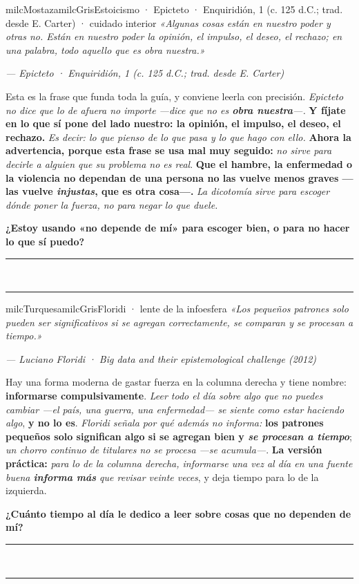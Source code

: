 \documentclass[11pt,letterpaper]{article}
\newcommand{\linead}[1]{\noindent\color{milcLinea}\rule{#1}{0.5pt}\color{milcNegro}}
\begin{document}
\begin{softbox}{milcMostaza}{milcGris}{Estoicismo · Epicteto · Enquiridión, 1 (c. 125 d.C.; trad. desde E. Carter) · cuidado interior}
\textit{«Algunas cosas están en nuestro poder y otras no. Están en nuestro poder la opinión, el impulso, el deseo, el rechazo; en una palabra, todo aquello que es obra nuestra.»}

{\footnotesize\itshape\color{milcNegro!70}--- Epicteto · Enquiridión, 1 (c. 125 d.C.; trad. desde E. Carter)}

Esta es la frase que funda toda la guía, y conviene leerla con precisión. \emph{Epicteto no dice que lo de afuera no importe ---dice que no es \textbf{obra nuestra}---.} \textbf{Y fíjate en lo que sí pone del lado nuestro: la opinión, el impulso, el deseo, el rechazo.} \emph{Es decir: lo que pienso de lo que pasa y lo que hago con ello.} \textbf{Ahora la advertencia, porque esta frase se usa mal muy seguido:} \emph{no sirve para decirle a alguien que su problema no es real}. \textbf{Que el hambre, la enfermedad o la violencia no dependan de una persona no las vuelve menos graves ---las vuelve \emph{injustas}, que es otra cosa---.} \emph{La dicotomía sirve para escoger dónde poner la fuerza, no para negar lo que duele.}

\textbf{¿Estoy usando «no depende de mí» para escoger bien, o para no hacer lo que sí puedo?}
\end{softbox}
\linead{\linewidth}\\[1mm]
\linead{\linewidth}

\begin{softbox}{milcTurquesa}{milcGris}{Floridi · lente de la infoesfera}
\textit{«Los pequeños patrones solo pueden ser significativos si se agregan correctamente, se comparan y se procesan a tiempo.»}

{\footnotesize\itshape\color{milcNegro!70}--- Luciano Floridi · Big data and their epistemological challenge (2012)}

Hay una forma moderna de gastar fuerza en la columna derecha y tiene nombre: \textbf{informarse compulsivamente}. \emph{Leer todo el día sobre algo que no puedes cambiar ---el país, una guerra, una enfermedad--- se siente como estar haciendo algo}, \textbf{y no lo es}. \emph{Floridi señala por qué además no informa:} \textbf{los patrones pequeños solo significan algo si se agregan bien y \emph{se procesan a tiempo}}; \emph{un chorro continuo de titulares no se procesa ---se acumula---}. \textbf{La versión práctica:} \emph{para lo de la columna derecha, informarse una vez al día en una fuente buena \textbf{informa más} que revisar veinte veces}, y deja tiempo para lo de la izquierda.

\textbf{¿Cuánto tiempo al día le dedico a leer sobre cosas que no dependen de mí?}
\end{softbox}
\linead{\linewidth}\\[1mm]
\linead{\linewidth}
\end{document}

